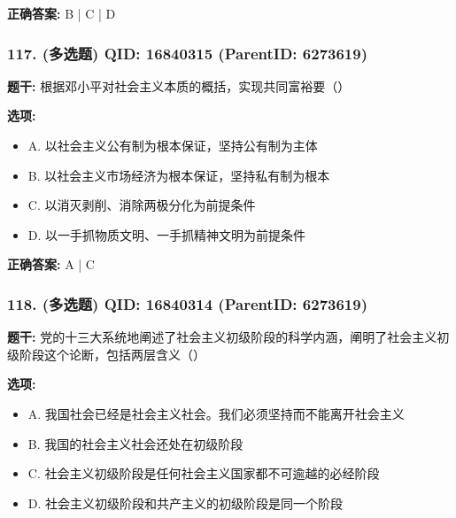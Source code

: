 \documentclass[12pt,UTF8]{ctexart}
\begin{document}
\textbf{正确答案:}
B | C | D

\vspace{0.3em}\hrulefill\vspace{0.7em}

\subsubsection*{117. (多选题) \small QID: 16840315 (ParentID: 6273619)}

\textbf{题干:}
根据邓小平对社会主义本质的概括，实现共同富裕要（）



\textbf{选项:}
\begin{itemize}[leftmargin=*]

  \item A. 以社会主义公有制为根本保证，坚持公有制为主体

  \item B. 以社会主义市场经济为根本保证，坚持私有制为根本

  \item C. 以消灭剥削、消除两极分化为前提条件

  \item D. 以一手抓物质文明、一手抓精神文明为前提条件

\end{itemize}

\textbf{正确答案:}
A | C

\vspace{0.3em}\hrulefill\vspace{0.7em}

\subsubsection*{118. (多选题) \small QID: 16840314 (ParentID: 6273619)}

\textbf{题干:}
党的十三大系统地阐述了社会主义初级阶段的科学内涵，阐明了社会主义初级阶段这个论断，包括两层含义（）



\textbf{选项:}
\begin{itemize}[leftmargin=*]

  \item A. 我国社会已经是社会主义社会。我们必须坚持而不能离开社会主义

  \item B. 我国的社会主义社会还处在初级阶段

  \item C. 社会主义初级阶段是任何社会主义国家都不可逾越的必经阶段

  \item D. 社会主义初级阶段和共产主义的初级阶段是同一个阶段

\end{itemize}
\end{document}
